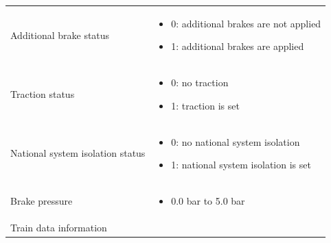 \documentclass[nocc]{template/openetcs_report}
\begin{document}
\begin{longtable}{|l|l|}
\begin{minipage}[t]{0.5\linewidth}
					\end{minipage} \\
				\hline
				\begin{minipage}[t]{0.5\linewidth} Additional brake status	\end{minipage} 
				&	\begin{minipage}[t]{0.5\linewidth}
						\begin{itemize}
							\item 0: additional brakes are not applied
							\item 1: additional brakes are applied
						\end{itemize}
					\end{minipage} \\					
				\hline
				\begin{minipage}[t]{0.5\linewidth} Traction status	\end{minipage} 
					&	\begin{minipage}[t]{0.5\linewidth}
							\begin{itemize}
								\item 0: no traction
								\item 1: traction is set
							\end{itemize}
						\end{minipage} \\					
					\hline
				\begin{minipage}[t]{0.5\linewidth} National system isolation status	\end{minipage} 
				&	\begin{minipage}[t]{0.5\linewidth}
						\begin{itemize}
							\item 0: no national system isolation
							\item 1: national system isolation is set
						\end{itemize}
					\end{minipage} \\
				\hline
				\begin{minipage}[t]{0.5\linewidth} Brake pressure	\end{minipage} 
				&	\begin{minipage}[t]{0.5\linewidth}
						\begin{itemize}
							\item 0.0 bar to 5.0 bar
						\end{itemize}
					\end{minipage} \\
				\hline
				\begin{minipage}[t]{0.5\linewidth} Train data information	\end{minipage} 

\end{longtable}
\end{document}

